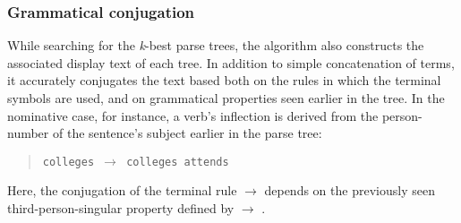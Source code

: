 \documentclass{article}
\begin{document}
\subsubsection{Grammatical conjugation}
While searching for the \textit{k}-best parse trees, the algorithm also constructs the associated display text of each tree. In addition to simple concatenation of terms, it accurately conjugates the text based both on the rules in which the terminal symbols are used, and on grammatical properties seen earlier in the tree. In the nominative case, for instance, a verb's inflection is derived from the person-number of the sentence's subject earlier in the parse tree:
\begin{quote}
\texttt{colleges   $\rightarrow$ colleges  attends}
\end{quote}
Here, the conjugation of the terminal rule  $\rightarrow$  depends on the previously seen third-person-singular property defined by  $\rightarrow$ \texttt{}.
\end{document}
